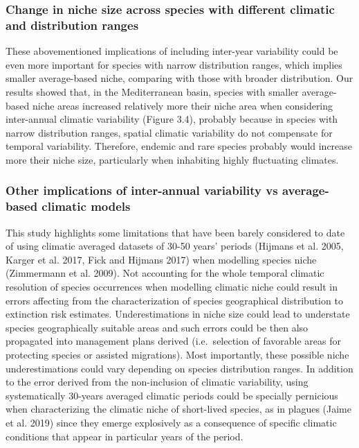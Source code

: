 \documentclass[11pt,twoside]{reedthesis}
\begin{document}
\subsubsection{Change in niche size across species with different
climatic and distribution
ranges}\label{change-in-niche-size-across-species-with-different-climatic-and-distribution-ranges}

These abovementioned implications of including inter-year variability
could be even more important for species with narrow distribution
ranges, which implies smaller average-based niche, comparing with those
with broader distribution. Our results showed that, in the Mediterranean
basin, species with smaller average-based niche areas increased
relatively more their niche area when considering inter-annual climatic
variability (Figure 3.4), probably because in species with narrow
distribution ranges, spatial climatic variability do not compensate for
temporal variability. Therefore, endemic and rare species probably would
increase more their niche size, particularly when inhabiting highly
fluctuating climates.\par

\subsubsection{Other implications of inter-annual variability vs
average-based climatic
models}\label{other-implications-of-inter-annual-variability-vs-average-based-climatic-models}

This study highlights some limitations that have been barely considered
to date of using climatic averaged datasets of 30-50 years' periods
(Hijmans et al. 2005, Karger et al. 2017, Fick and Hijmans 2017) when
modelling species niche (Zimmermann et al. 2009). Not accounting for the
whole temporal climatic resolution of species occurrences when modelling
climatic niche could result in errors affecting from the
characterization of species geographical distribution to extinction risk
estimates. Underestimations in niche size could lead to understate
species geographically suitable areas and such errors could be then also
propagated into management plans derived (i.e.~selection of favorable
areas for protecting species or assisted migrations). Most importantly,
these possible niche underestimations could vary depending on species
distribution ranges. In addition to the error derived from the
non-inclusion of climatic variability, using systematically 30-years
averaged climatic periods could be specially pernicious when
characterizing the climatic niche of short-lived species, as in plagues
(Jaime et al. 2019) since they emerge explosively as a consequence of
specific climatic conditions that appear in particular years of the
period.\par
\end{document}
